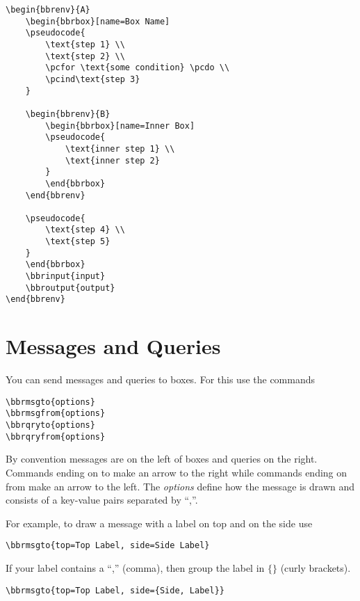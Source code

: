 \documentclass[a4paper]{report}
\begin{document}
\begin{lstlisting}
\begin{bbrenv}{A}
	\begin{bbrbox}[name=Box Name]
	\pseudocode{
		\text{step 1} \\
		\text{step 2} \\
		\pcfor \text{some condition} \pcdo \\
		\pcind\text{step 3} 
	}

	\begin{bbrenv}{B}
		\begin{bbrbox}[name=Inner Box]
		\pseudocode{
			\text{inner step 1} \\
			\text{inner step 2} 
		}
		\end{bbrbox}
	\end{bbrenv}

	\pseudocode{
		\text{step 4} \\
		\text{step 5} 
	}
	\end{bbrbox}
	\bbrinput{input}
	\bbroutput{output}
\end{bbrenv}
\end{lstlisting}

\section{Messages and Queries}

You can send messages and queries to boxes. For this use the commands 
\begin{lstlisting}
\bbrmsgto{options}
\bbrmsgfrom{options}
\bbrqryto{options}
\bbrqryfrom{options}
\end{lstlisting}
By convention messages are on the left of boxes and queries on the right. Commands ending on to
make an arrow to the right while commands ending on from make an arrow to the left. The \emph{options}
define how the message is drawn and consists of a key-value pairs separated by \enquote{,}.

For example, to draw a message with a label on top and on the side use
\begin{lstlisting}
\bbrmsgto{top=Top Label, side=Side Label}
\end{lstlisting}
If your label contains a \enquote{,} (comma), then group the label in $\{\}$ (curly brackets).
\begin{lstlisting}
\bbrmsgto{top=Top Label, side={Side, Label}}
\end{lstlisting}
\end{document}
